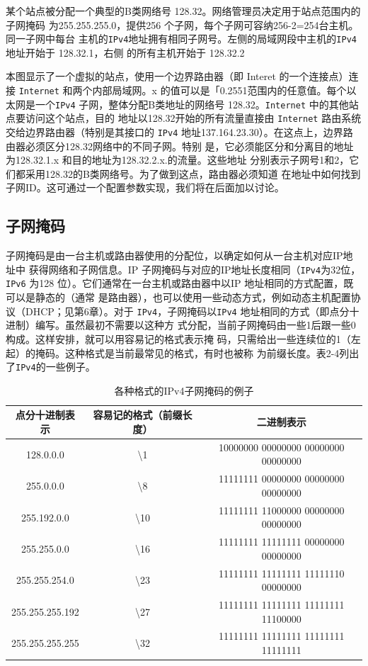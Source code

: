某个站点被分配一个典型的B类网络号 128.32。网络管理员决定用于站点范围内的子网掩码
为255.255.255.0，提供256 个子网，每个子网可容纳256-2=254台主机。同一子网中每台
主机的\verb|IPv4|地址拥有相同子网号。左侧的局域网段中主机的\verb|IPv4|地址开始于 128.32.1，右侧
的所有主机开始于 128.32.2

本图显示了一个虚拟的站点，使用一个边界路由器（即 Interet 的一个连接点）连接
\verb|Internet| 和两个内部局域网。x 的值可以是「0.2551范围内的任意值。每个以太网是一个\verb|IPv4|
子网，整体分配B类地址的网络号 128.32。\verb|Internet| 中的其他站点要访问这个站点，目的
地址以128.32开始的所有流量直接由 \verb|Internet| 路由系统交给边界路由器（特别是其接口的
\verb|IPv4| 地址137.164.23.30）。在这点上，边界路由器必须区分128.32网络中的不同子网。特别
是，它必须能区分和分离目的地址为128.32.1.x 和目的地址为128.32.2.x.的流量。这些地址
分别表示子网号1和2，它们都采用128.32的B类网络号。为了做到这点，路由器必须知道
在地址中如何找到子网ID。这可通过一个配置参数实现，我们将在后面加以讨论。

\subsection{子网掩码}
子网掩码是由一台主机或路由器使用的分配位，以确定如何从一台主机对应IP地址中
获得网络和子网信息。IP 子网掩码与对应的IP地址长度相同（\verb|IPv4|为32位，\verb|IPv6| 为128
位）。它们通常在一台主机或路由器中以IP 地址相同的方式配置，既可以是静态的（通常
是路由器），也可以使用一些动态方式，例如动态主机配置协议（DHCP；见第6章）。对于
\verb|IPv4|，子网掩码以\verb|IPv4| 地址相同的方式（即点分十进制）编写。虽然最初不需要以这种方
式分配，当前子网掩码由一些1后跟一些0构成。这样安排，就可以用容易记的格式表示掩
码，只需给出一些连续位的1（左起）的掩码。这种格式是当前最常见的格式，有时也被称
为前缀长度。表2-4列出了\verb|IPv4|的一些例子。

\begin{table}[]
    \centering
    \caption{各种格式的IPv4子网掩码的例子}
    \begin{tabular}{c|c|c}
        \hline
        点分十进制表示	  &	容易记的格式（前缀长度）	&	    二进制表示	     \\ \hline
        128.0.0.0	    &   \textbackslash 1	    &	10000000 00000000 00000000 00000000	 \\ \hline
        255.0.0.0	    &	\textbackslash 8	    &	11111111 00000000 00000000 00000000	 \\ \hline
        255.192.0.0	    &	\textbackslash 10	&	11111111 11000000 00000000 00000000	 \\ \hline
        255.255.0.0	    &	\textbackslash 16	&	11111111 11111111 00000000 00000000	 \\ \hline
        255.255.254.0	&	\textbackslash 23	&	11111111 11111111 11111110 00000000	 \\ \hline
        255.255.255.192	&	\textbackslash 27	&	11111111 11111111 11111111 11100000	 \\ \hline
        255.255.255.255	&	\textbackslash 32	&	11111111 11111111 11111111 11111111	 \\ \hline
    \end{tabular}
\end{table}


